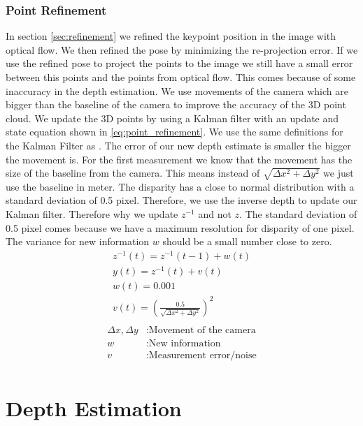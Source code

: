 \documentclass[11pt,a4paper,titlepage,oneside]{report}
\begin{document}
\subsection{Point Refinement}
In section \ref{sec:refinement} we refined the keypoint position in the image with optical flow. We then refined the pose by minimizing the re-projection error. If we use the refined pose to project the points to the image we still have a small error between this points and the points from optical flow. This comes because of some inaccuracy in the depth estimation. We use movements of the camera which are bigger than the baseline of the camera to improve the accuracy of the 3D point cloud. We update the 3D points by using a Kalman filter with an update and state equation shown in \ref{eq:point_refinement}. We use the same definitions for the Kalman Filter as \cite{statdig}. The error of our new depth estimate is smaller the bigger the movement is. For the first measurement we know that the movement has the size of the baseline from the camera. This means instead of $\sqrt{\Delta x^2+\Delta y^2}$ we just use the baseline in meter. The disparity has a close to normal distribution with a standard deviation of 0.5 pixel. Therefore, we use the inverse depth to update our Kalman filter. Therefore why we update $z^{-1}$ and not $z$. The standard deviation of 0.5 pixel comes because we have a maximum resolution for disparity of one pixel. The variance for new information $w$ should be a small number close to zero.
\begin{equation}\label{eq:point_refinement}
  \begin{gathered}
		z^{-1}(t)=z^{-1}(t-1)+w(t)\\
    y(t)=z^{-1}(t)+v(t)\\
    w(t)=0.001\\
		v(t)=(\frac{0.5}{\sqrt{\Delta x^2 + \Delta y^2}})^2\\
  \end{gathered}
\end{equation}
\begin{align*}
  \Delta x, \Delta y  &: \text{Movement of the camera}\\
  w                   &: \text{New information}\\
  v                   &: \text{Measurement error/noise}\\
\end{align*}

\chapter{Depth Estimation}\label{ch:depth}
\end{document}
